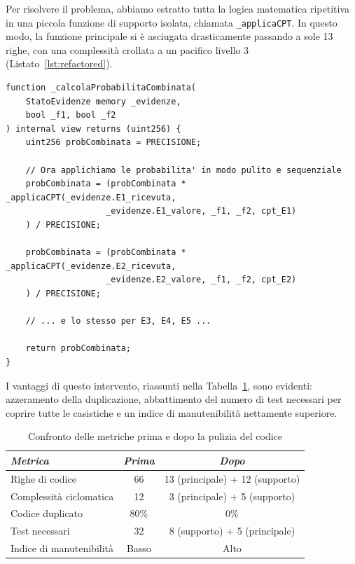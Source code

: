 Per risolvere il problema, abbiamo estratto tutta la logica matematica ripetitiva in una piccola funzione di supporto isolata, chiamata \texttt{\_applicaCPT}. In questo modo, la funzione principale si è asciugata drasticamente passando a sole 13 righe, con una complessità crollata a un pacifico livello 3 (Listato~\ref{lst:refactored}).

\begin{lstlisting}[language=Solidity, caption={La funzione principale dopo il refactoring}, label=lst:refactored]
function _calcolaProbabilitaCombinata(
    StatoEvidenze memory _evidenze,
    bool _f1, bool _f2
) internal view returns (uint256) {
    uint256 probCombinata = PRECISIONE;
    
    // Ora applichiamo le probabilita' in modo pulito e sequenziale
    probCombinata = (probCombinata * _applicaCPT(_evidenze.E1_ricevuta, 
                    _evidenze.E1_valore, _f1, _f2, cpt_E1)
    ) / PRECISIONE;
    
    probCombinata = (probCombinata * _applicaCPT(_evidenze.E2_ricevuta, 
                    _evidenze.E2_valore, _f1, _f2, cpt_E2)
    ) / PRECISIONE;
    
    // ... e lo stesso per E3, E4, E5 ...
    
    return probCombinata;
}
\end{lstlisting}

I vantaggi di questo intervento, riassunti nella Tabella~\ref{tab:confronto-refactoring}, sono evidenti: azzeramento della duplicazione, abbattimento del numero di test necessari per coprire tutte le casistiche e un indice di manutenibilità nettamente superiore.

\begin{table}[H]
\centering
\caption{Confronto delle metriche prima e dopo la pulizia del codice}
\label{tab:confronto-refactoring}
\begin{tabular}{lcc}
\toprule
\textit{Metrica} & \textit{Prima} & \textit{Dopo} \\
\midrule
Righe di codice & 66 & 13 (principale) + 12 (supporto) \\
Complessità ciclomatica & 12 & 3 (principale) + 5 (supporto) \\
Codice duplicato & 80\% & 0\% \\
Test necessari & 32 & 8 (supporto) + 5 (principale) \\
Indice di manutenibilità & Basso & Alto \\
\bottomrule
\end{tabular}
\end{table}

